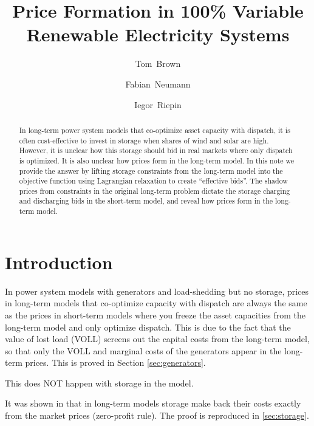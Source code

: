 \documentclass[final,3p]{elsarticle}
\begin{document}
\begin{frontmatter}

  \title{Price Formation in 100\% Variable Renewable Electricity Systems}

  \author[tub]{Tom~Brown}
  \author[tub]{Fabian~Neumann}
  \author[tub]{Iegor~Riepin}

  \address[tub]{Department of Digital Transformation in Energy Systems, Institute of Energy Technology, Technische Universität Berlin (TUB), Einsteinufer 25 (TA 8), 10587, Berlin, Germany}


  \begin{abstract}
    In long-term power system models that co-optimize asset capacity with
    dispatch, it is often cost-effective to invest in storage when shares of
    wind and solar are high. However, it is unclear how this storage should bid
    in real markets where only dispatch is optimized. It is also unclear how
    prices form in the long-term model. In this note we provide the answer by
    lifting storage constraints from the long-term model into the objective
    function using Lagrangian relaxation to create ``effective bids''. The
    shadow prices from constraints in the original long-term problem dictate the
    storage charging and discharging bids in the short-term model, and reveal
    how prices form in the long-term model.
  \end{abstract}

\end{frontmatter}

\section{Introduction}

In power system models with generators and load-shedding but no storage, prices
in long-term models that co-optimize capacity with dispatch are always the same
as the prices in short-term models where you freeze the asset capacities from
the long-term model and only optimize dispatch. This is due to the fact that the
value of lost load (VOLL) screens out the capital costs from the long-term
model, so that only the VOLL and marginal costs of the generators appear in the
long-term prices. This is proved in Section \ref{sec:generators}.

This does NOT happen with storage in the model. 

It was shown in \cite{Brown2020} that in long-term models storage make back
their costs exactly from the market prices (zero-profit rule). The proof is
reproduced in \ref{sec:storage}.
\end{document}
